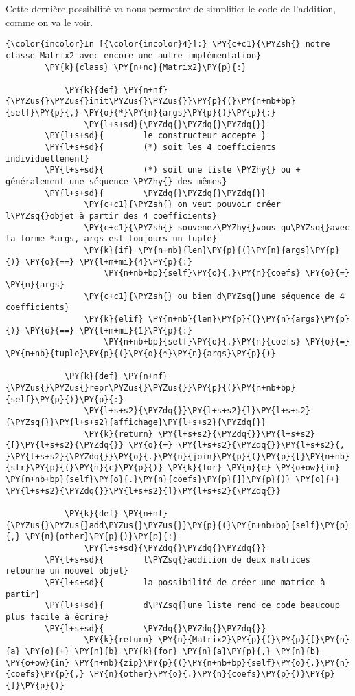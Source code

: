 Cette dernière possibilité va nous permettre de simplifier le code de
l'addition, comme on va le voir.

    \begin{Verbatim}[commandchars=\\\{\}]
{\color{incolor}In [{\color{incolor}4}]:} \PY{c+c1}{\PYZsh{} notre classe Matrix2 avec encore une autre implémentation}
        \PY{k}{class} \PY{n+nc}{Matrix2}\PY{p}{:}
        
            \PY{k}{def} \PY{n+nf}{\PYZus{}\PYZus{}init\PYZus{}\PYZus{}}\PY{p}{(}\PY{n+nb+bp}{self}\PY{p}{,} \PY{o}{*}\PY{n}{args}\PY{p}{)}\PY{p}{:}
                \PY{l+s+sd}{\PYZdq{}\PYZdq{}\PYZdq{}}
        \PY{l+s+sd}{        le constructeur accepte }
        \PY{l+s+sd}{        (*) soit les 4 coefficients individuellement}
        \PY{l+s+sd}{        (*) soit une liste \PYZhy{} ou + généralement une séquence \PYZhy{} des mêmes}
        \PY{l+s+sd}{        \PYZdq{}\PYZdq{}\PYZdq{}}
                \PY{c+c1}{\PYZsh{} on veut pouvoir créer l\PYZsq{}objet à partir des 4 coefficients}
                \PY{c+c1}{\PYZsh{} souvenez\PYZhy{}vous qu\PYZsq{}avec la forme *args, args est toujours un tuple}
                \PY{k}{if} \PY{n+nb}{len}\PY{p}{(}\PY{n}{args}\PY{p}{)} \PY{o}{==} \PY{l+m+mi}{4}\PY{p}{:}
                    \PY{n+nb+bp}{self}\PY{o}{.}\PY{n}{coefs} \PY{o}{=} \PY{n}{args}
                \PY{c+c1}{\PYZsh{} ou bien d\PYZsq{}une séquence de 4 coefficients}
                \PY{k}{elif} \PY{n+nb}{len}\PY{p}{(}\PY{n}{args}\PY{p}{)} \PY{o}{==} \PY{l+m+mi}{1}\PY{p}{:}
                    \PY{n+nb+bp}{self}\PY{o}{.}\PY{n}{coefs} \PY{o}{=} \PY{n+nb}{tuple}\PY{p}{(}\PY{o}{*}\PY{n}{args}\PY{p}{)}
        
            \PY{k}{def} \PY{n+nf}{\PYZus{}\PYZus{}repr\PYZus{}\PYZus{}}\PY{p}{(}\PY{n+nb+bp}{self}\PY{p}{)}\PY{p}{:}
                \PY{l+s+s2}{\PYZdq{}}\PY{l+s+s2}{l}\PY{l+s+s2}{\PYZsq{}}\PY{l+s+s2}{affichage}\PY{l+s+s2}{\PYZdq{}}
                \PY{k}{return} \PY{l+s+s2}{\PYZdq{}}\PY{l+s+s2}{[}\PY{l+s+s2}{\PYZdq{}} \PY{o}{+} \PY{l+s+s2}{\PYZdq{}}\PY{l+s+s2}{, }\PY{l+s+s2}{\PYZdq{}}\PY{o}{.}\PY{n}{join}\PY{p}{(}\PY{p}{[}\PY{n+nb}{str}\PY{p}{(}\PY{n}{c}\PY{p}{)} \PY{k}{for} \PY{n}{c} \PY{o+ow}{in} \PY{n+nb+bp}{self}\PY{o}{.}\PY{n}{coefs}\PY{p}{]}\PY{p}{)} \PY{o}{+} \PY{l+s+s2}{\PYZdq{}}\PY{l+s+s2}{]}\PY{l+s+s2}{\PYZdq{}}
        
            \PY{k}{def} \PY{n+nf}{\PYZus{}\PYZus{}add\PYZus{}\PYZus{}}\PY{p}{(}\PY{n+nb+bp}{self}\PY{p}{,} \PY{n}{other}\PY{p}{)}\PY{p}{:}
                \PY{l+s+sd}{\PYZdq{}\PYZdq{}\PYZdq{}}
        \PY{l+s+sd}{        l\PYZsq{}addition de deux matrices retourne un nouvel objet}
        \PY{l+s+sd}{        la possibilité de créer une matrice à partir}
        \PY{l+s+sd}{        d\PYZsq{}une liste rend ce code beaucoup plus facile à écrire}
        \PY{l+s+sd}{        \PYZdq{}\PYZdq{}\PYZdq{}}
                \PY{k}{return} \PY{n}{Matrix2}\PY{p}{(}\PY{p}{[}\PY{n}{a} \PY{o}{+} \PY{n}{b} \PY{k}{for} \PY{n}{a}\PY{p}{,} \PY{n}{b} \PY{o+ow}{in} \PY{n+nb}{zip}\PY{p}{(}\PY{n+nb+bp}{self}\PY{o}{.}\PY{n}{coefs}\PY{p}{,} \PY{n}{other}\PY{o}{.}\PY{n}{coefs}\PY{p}{)}\PY{p}{]}\PY{p}{)}
        

\end{Verbatim}
